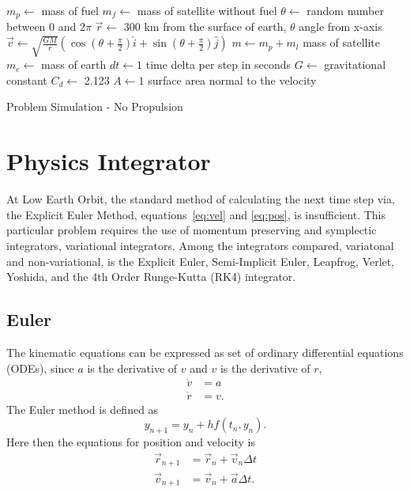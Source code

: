 \begin{algorithm}
	\SetAlgoLined
	\DontPrintSemicolon
	$m_p\leftarrow$ mass of fuel\;
	$m_f\leftarrow$ mass of satellite without fuel\;
	$\theta\leftarrow$ random number between $0$ and $2\pi$\;
	$\vec{r}\leftarrow$ 300 km from the surface of earth, $\theta$ angle from x-axis\;
	$\vec{v}\leftarrow \sqrt{\frac{GM}{r}}(\cos(\theta+\frac{\pi}{2})\hat{i}+\sin(\theta+\frac{\pi}{2})\hat{j})$ \;
	$m\leftarrow m_p+m_l$ mass of satellite \;
	$m_e\leftarrow$ mass of earth \;
	$dt\leftarrow 1$ time delta per step in seconds \;
	$G\leftarrow$ gravitational constant \;
	$C_d\leftarrow$ 2.123 \;
	$A\leftarrow1$ surface area normal to the velocity\;
	\caption{Problem Simulation - No Propulsion}\label{alg:problemsim}
\end{algorithm}

\section{Physics Integrator}

At Low Earth Orbit, the standard method of calculating the next time step via, the Explicit Euler Method, equations~\ref{eq:vel} and \ref{eq:pos}, is insufficient. This particular problem requires the use of momentum preserving and symplectic integrators, variational integrators. Among the integrators compared, variatonal and non-variational, is the Explicit Euler, Semi-Implicit Euler, Leapfrog, Verlet, Yoshida, and the 4th Order Runge-Kutta (RK4) integrator.

\subsection{Euler}
The kinematic equations can be expressed as set of ordinary differential equations (ODEs), since $a$ is the derivative of $v$ and $v$ is the derivative of $r$,
\begin{align*}
\dot{v}&=a\\
\dot{r}&=v.
\end{align*} The Euler method is defined as $$y_{n+1}=y_n+hf(t_n, y_n).$$ Here then the equations for position and velocity is 
\begin{align*}
\vec{r}_{n+1}&=\vec{r}_n+\vec{v}_n \Delta t\\
\vec{v}_{n+1}&=\vec{v}_n+\vec{a} \Delta t.
\end{align*}

